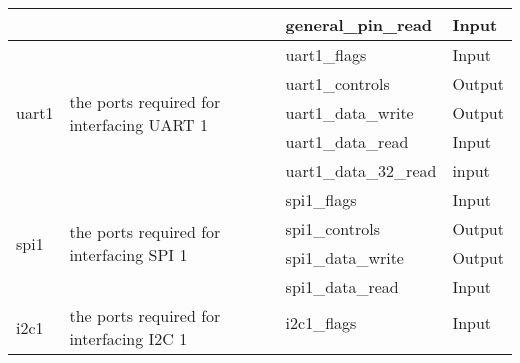 \begin{table}[!h]
{\begin{tabular}{|l|l|l|l|}
                                                  &                                                                 & general\_pin\_read                         & Input                              \\ \hline
            \multirow{5}{*}{uart1}                & \multirow{5}{*}{the ports required for interfacing UART 1}      & uart1\_flags                               & Input                              \\ \cline{3-4}
                                                  &                                                                 & uart1\_controls                            & Output                             \\ \cline{3-4}
                                                  &                                                                 & uart1\_data\_write                         & Output                             \\ \cline{3-4}
                                                  &                                                                 & uart1\_data\_read                          & Input                              \\ \cline{3-4}
                                                  &                                                                 & uart1\_data\_32\_read                      & input                              \\ \hline
            \multirow{4}{*}{spi1}                 & \multirow{4}{*}{the ports required for interfacing SPI 1}       & spi1\_flags                                & Input                              \\ \cline{3-4}
                                                  &                                                                 & spi1\_controls                             & Output                             \\ \cline{3-4}
                                                  &                                                                 & spi1\_data\_write                          & Output                             \\ \cline{3-4}
                                                  &                                                                 & spi1\_data\_read                           & Input                              \\ \hline
            \multirow{5}{*}{i2c1}                 & \multirow{5}{*}{the ports required for interfacing I2C 1}       & i2c1\_flags                                & Input                              \\ \cline{3-4}

\end{tabular}}
\end{table}

